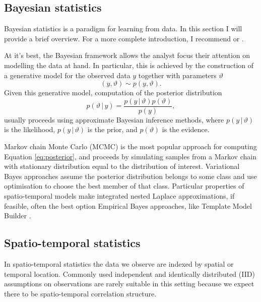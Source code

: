 \documentclass[a4paper, nobind]{templates/ociamthesis}
\begin{document}
\hypertarget{bayesian-statistics}{%
\subsection{Bayesian statistics}\label{bayesian-statistics}}

Bayesian statistics is a paradigm for learning from data.
In this section I will provide a brief overview.
For a more complete introduction, I recommend \textcite{mcelreath2020statistical} or \textcite{gelman2013bayesian}.

At it's best, the Bayesian framework allows the analyst focus their attention on modelling the data at hand.
In particular, this is achieved by the construction of a generative model for the observed data \(y\) together with parameters \(\vartheta\)
\begin{equation}
(y, \vartheta) \sim p(y, \vartheta).
\end{equation}
Given this generative model, computation of the posterior distribution
\begin{equation}
p(\vartheta \, | \, y) = \frac{p(y \, | \, \vartheta) p(\vartheta)}{p(y)}, \label{eq:posterior}
\end{equation}
usually proceeds using approximate Bayesian inference methods, where \(p(y \, | \, \vartheta)\) is the likelihood, \(p(y \, | \, \vartheta)\) is the prior, and \(p(\vartheta)\) is the evidence.

Markov chain Monte Carlo (MCMC) is the most popular approach for computing Equation \ref{eq:posterior}, and proceeds by simulating samples from a Markov chain with stationary distribution equal to the distribution of interest.
Variational Bayes approaches assume the posterior distribution belongs to some class and use optimisation to choose the best member of that class.
Particular properties of spatio-temporal models make integrated nested Laplace approximations, if feasible, often the best option
Empirical Bayes approaches, like Template Model Builder \autocite{osgoodzimmerman2021statistical}.

\hypertarget{spatio-temporal-statistics}{%
\subsection{Spatio-temporal statistics}\label{spatio-temporal-statistics}}

In spatio-temporal statistics the data we observe are indexed by spatial or temporal location.
Commonly used independent and identically distributed (IID) assumptions on observations are rarely suitable in this setting because we expect there to be spatio-temporal correlation structure.
\end{document}
